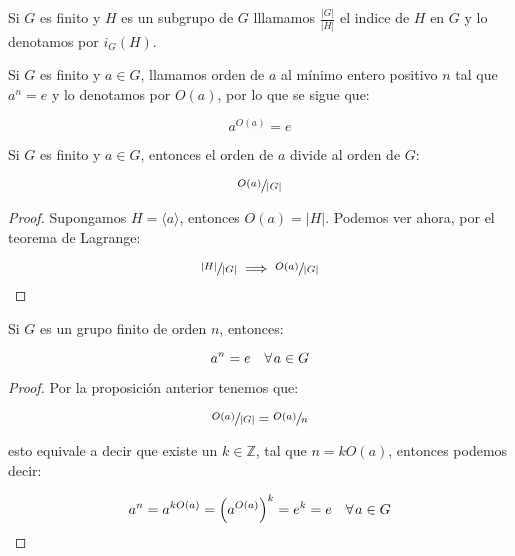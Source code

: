         \begin{definicion}
            Si $G$ es finito y $H$ es un subgrupo de $G$ lllamamos $\frac{|G|}{|H|}$ el indice de $H$ en $G$ y lo denotamos por $i_G(H)$.
        \end{definicion}

        \begin{definicion}
            Si $G$ es finito y $a \in G$, llamamos orden de $a$ al mínimo entero positivo $n$ tal que $a^n = e$ y lo denotamos por $O(a)$, por lo que se sigue que:

            \begin{equation}
                a^{O(a)} = e
            \end{equation}
        \end{definicion}

        \begin{proposicion}
            Si $G$ es finito y $a \in G$, entonces el orden de $a$ divide al orden de $G$:

            \begin{equation}
                \sfrac{O(a)}{|G|}
            \end{equation}
        \end{proposicion}

        \begin{proof}
            Supongamos $H = \langle a \rangle$, entonces $O(a) = |H|$. Podemos ver ahora, por el teorema de Lagrange:

            \begin{equation*}
                \sfrac{|H|}{|G|} \implies \sfrac{O(a)}{|G|}
            \end{equation*}
        \end{proof}

        \begin{corolario}
            Si $G$ es un grupo finito de orden $n$, entonces:

            \begin{equation}
                a^n = e \quad \forall \mkern2mu a \in G
            \end{equation}
        \end{corolario}

        \begin{proof}
            Por la proposición anterior tenemos que:

            \begin{equation*}
                \sfrac{O(a)}{|G|} = \sfrac{O(a)}{n}
            \end{equation*}

            esto equivale a decir que existe un $k \in \mathbb{Z}$, tal que $n = k O(a)$, entonces podemos decir:

            \begin{equation*}
                a^n = a^{k O(a)} = \left( a^{O(a)} \right)^k = e^k = e \quad \forall \mkern2mu a \in G
            \end{equation*}
        \end{proof}

